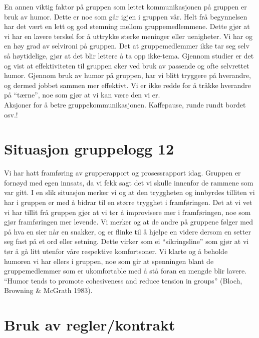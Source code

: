 En annen viktig faktor på gruppen som lettet kommunikasjonen på gruppen er bruk av humor. Dette er noe som går igjen i gruppen vår. Helt frå begynnelsen har det vært en lett og god stemning mellom gruppemedlemmene. Dette gjør at vi har en lavere terskel for å uttrykke sterke meninger eller uenigheter. Vi har og en høy grad av selvironi på gruppen. Det at gruppemedlemmer ikke tar seg selv så høytidelige, gjør at det blir lettere å ta opp ikke-tema. Gjennom studier er det og vist at effektiviteten til gruppen øker ved bruk av passende og ofte selvrettet humor. Gjennom bruk av humor på gruppen, har vi blitt tryggere på hverandre, og dermed jobbet sammen mer effektivt. Vi er ikke redde for å tråkke hverandre på ``tærne'', noe som gjør at vi kan være den vi er. \\

Aksjoner for å betre gruppekommunikasjonen. Kaffepause, runde rundt bordet osv.!\\

\section{Situasjon gruppelogg 12}
Vi har hatt framføring av grupperapport og prosessrapport idag. Gruppen er fornøyd med egen innsats, da vi fekk sagt det vi skulle innenfor de rammene som var gitt. I en slik situasjon merker vi og at den tryggheten og innbyrdes tilliten vi har i gruppen er med å bidrar til en større trygghet i framføringen. Det at vi vet vi har tillit frå gruppen gjør at vi tør å improvisere mer i framføringen, noe som gjør framføringen mer levende. Vi merker og at de andre på gruppene følger med på hva en sier når en snakker, og er flinke til å hjelpe en videre dersom en setter seg fast på et ord eller setning. Dette virker som ei ``sikringsline'' som gjør at vi tør å gå litt utenfor våre respektive komfortsoner. Vi klarte og å beholde humoren vi har ellers i gruppen, noe som gir at spenningen blant de gruppemedlemmer som er ukomfortable med å stå foran en mengde blir lavere. ``Humor tends to promote cohesiveness and reduce tension in groups'' (Bloch, Browning \& McGrath 1983).\\


\section{Bruk av regler/kontrakt}


